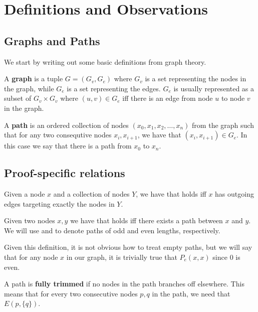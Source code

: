 \section{Definitions and Observations}
\label{sec:Definitions and Observations}
\subsection{Graphs and Paths}
\label{sub:Graphs and Paths}
We start by writing out some basic definitions from graph theory.
\begin{definition}
  A \textbf{graph} is a tuple $G = (G_v, G_e)$ where $G_v$ is a set representing the nodes in the graph, while $G_e$ is a set representing the edges.  $G_e$ is usually represented as a subset of $G_v \times G_v$ where $(u,v) \in G_e$ iff there is an edge from node $u$ to node $v$ in the graph.
\end{definition}
\begin{definition}
  A \textbf{path} is an ordered collection of nodes $(x_0, x_1, x_2, \dots, x_n)$ from the graph such that for any two consequtive nodes $x_i,x_{i+1}$, we have that $(x_i, x_{i+1}) \in G_e$.
  In this case we say that there is a path from $x_0$ to $x_n$.
\end{definition}
\subsection{Proof-specific relations}
\label{sub:Proof-specific relations}
\begin{definition}
  Given a node $x$ and a collection of nodes $Y$, we have that  holds iff $x$ has outgoing edges targeting exactly the nodes in $Y$.
\end{definition}
\begin{definition}
  Given two nodes $x,y$ we have that  holds iff there exists a path between $x$ and $y$.
  We will use  and  to denote paths of odd and even lengths, respectively.
\end{definition}
  Given this definition, it is not obvious how to treat empty paths, but we will say that for any node $x$ in our graph, it is trivially true that $P_e(x,x)$ since $0$ is even.
\begin{definition}
  A path is \textbf{fully trimmed} if no nodes in the path branches off elsewhere.
  This means that for every two consecutive nodes $p,q$ in the path, we need that $E(p,\{q\})$.
\end{definition}

